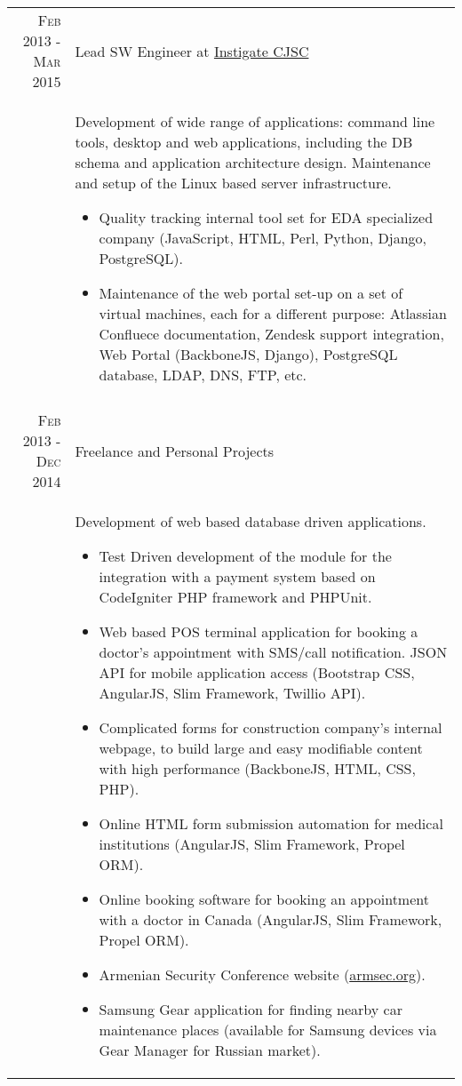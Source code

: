 \documentclass[a4paper,10pt]{article}
\begin{document}

\begin{tabular}{r|p{11cm}}


\textsc{Feb 2013 - Mar 2015}
  & Lead SW Engineer at
    \href{http://www.instigatedesign.com/}{Instigate CJSC} \\

& \footnotesize{ Development of wide range of applications: command line tools,
desktop and web applications, including the DB schema and application
architecture design. Maintenance and setup of the Linux based server infrastructure.
  \begin{itemize}
    \item Quality tracking internal tool set for EDA specialized company
      (JavaScript, HTML, Perl, Python, Django, PostgreSQL).
    \item Maintenance of the web portal set-up on a set of virtual machines,
      each for a different purpose: Atlassian Confluece documentation, Zendesk
      support integration, Web Portal (BackboneJS, Django), PostgreSQL
      database, LDAP, DNS, FTP, etc.
  \end{itemize}
} \\


\multicolumn{2}{c}{} \\


\textsc{Feb 2013 - Dec 2014}
  & Freelance and Personal Projects \\

& \footnotesize{ Development of web based database driven applications.
  \begin{itemize}
    \item Test Driven development of the module for the integration with a
          payment system based on CodeIgniter PHP framework and PHPUnit.
    \item Web based POS terminal application for booking a doctor's appointment
          with SMS/call notification. JSON API for mobile application access
          (Bootstrap CSS, AngularJS, Slim Framework, Twillio API).
    \item Complicated forms for construction company's internal webpage, to
          build large and easy modifiable content with high performance
          (BackboneJS, HTML, CSS, PHP).
    \item Online HTML form submission automation for medical institutions
          (AngularJS, Slim Framework, Propel ORM).
    \item Online booking software for booking an appointment with a doctor in
          Canada (AngularJS, Slim Framework, Propel ORM).
    \item Armenian Security Conference website
          (\href{http://www.armsec.org}{armsec.org}).
    \item Samsung Gear application for finding nearby car maintenance places
          (available for Samsung devices via Gear Manager for Russian market).
  \end{itemize}
} \\



\end{tabular}
\end{document}

